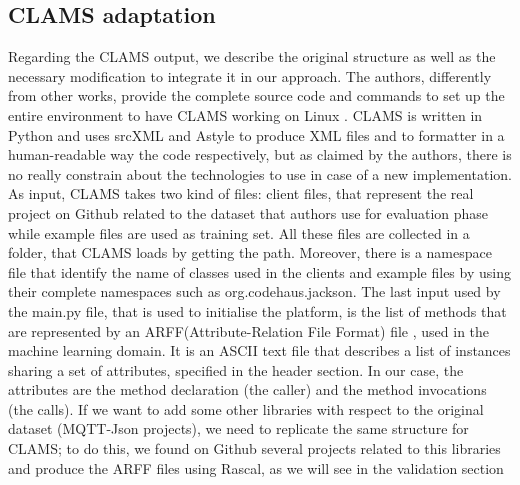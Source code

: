 \subsection{CLAMS adaptation}
Regarding the CLAMS output, we describe the original structure as well as the necessary modification to integrate it in our approach. The authors, differently from other works, provide the complete source code and commands to set up the entire environment to have CLAMS working on Linux . CLAMS is written in Python and uses srcXML and Astyle to produce XML files and to formatter in a human-readable way the code respectively, but as claimed by the authors, there is no really constrain about the technologies to use in case of a new implementation. As input, CLAMS takes two kind of files: client files, that represent the real project on Github related to the dataset that authors use for evaluation phase while example files are used as training set. All these files are collected in a folder, that CLAMS loads by getting the path. Moreover, there is a namespace file that identify the name of classes used in the clients and example files by using their complete namespaces such as org.codehaus.jackson. The last input used by the main.py file, that is used to initialise the platform, is the list of methods that are represented by an ARFF(Attribute-Relation File Format) file \cite{https://www.cs.waikato.ac.nz_last_nodate}, used in the machine learning domain. It is an ASCII text file that describes a list of instances sharing a set of attributes, specified in the header section. In our case, the attributes are the method declaration (the caller) and the method invocations (the calls). 
If we want to add some other libraries with respect to the original dataset (MQTT-Json projects), we need to replicate the same structure for CLAMS; to do this, we found on Github several projects related to this libraries and produce the ARFF files using Rascal, as we will see in the validation section
\newline
